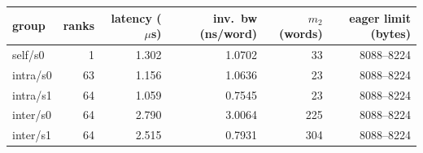 \begin{tabular}{lrrrrr}
\toprule
group & ranks & latency ($\mu$s) & inv.\ bw (ns/word) & $m_2$ (words) & eager limit (bytes) \\
\midrule
self/s0 & 1 & 1.302 & 1.0702 & 33 & 8088--8224 \\
intra/s0 & 63 & 1.156 & 1.0636 & 23 & 8088--8224 \\
intra/s1 & 64 & 1.059 & 0.7545 & 23 & 8088--8224 \\
inter/s0 & 64 & 2.790 & 3.0064 & 225 & 8088--8224 \\
inter/s1 & 64 & 2.515 & 0.7931 & 304 & 8088--8224 \\
\bottomrule
\end{tabular}
